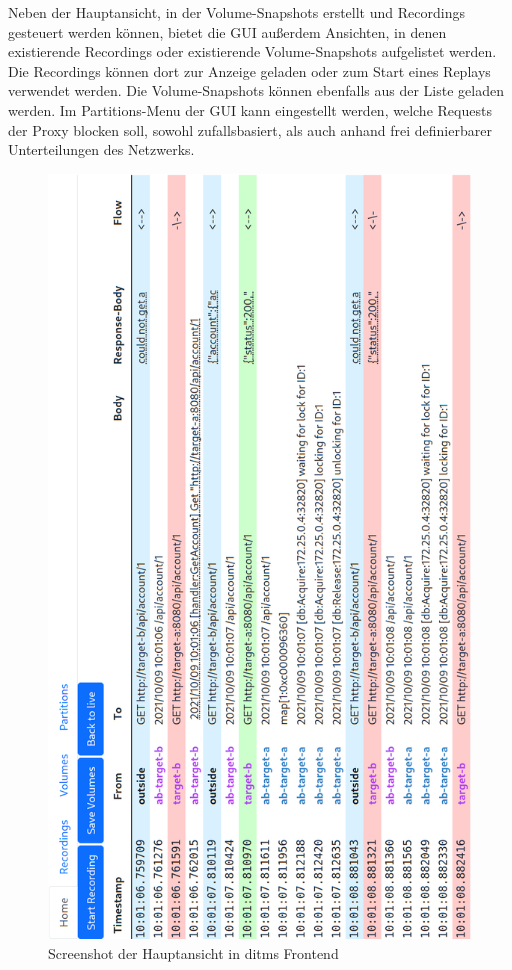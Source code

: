 \documentclass[12pt,a4paper]{report}
\begin{document}
Neben der Hauptansicht, in der Volume-Snapshots erstellt und Recordings gesteuert werden können, bietet die GUI außerdem
Ansichten, in denen existierende Recordings oder existierende Volume-Snapshots aufgelistet werden. Die Recordings können dort zur
Anzeige geladen oder zum Start eines Replays verwendet werden. Die Volume-Snapshots können ebenfalls aus der Liste geladen
werden. Im Partitions-Menu der GUI kann eingestellt werden, welche Requests der Proxy blocken soll, sowohl zufallsbasiert, als
auch anhand frei definierbarer Unterteilungen des Netzwerks.

\begin{figure}[H]
	\centering
	\includegraphics[width=.8\linewidth]{img/ditm_screenshot.png}
	\caption{Screenshot der Hauptansicht in ditms Frontend}
	\label{fig:gui}
\end{figure}
\end{document}
